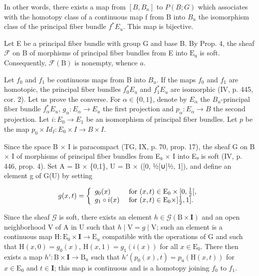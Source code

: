 In other words, there exists a map from \([B, B_{u}]\) to \(P(B; G)\) which associates with the homotopy class of a continuous map f from B into \(B_{u}\) the isomorphism class of the principal fiber bundle \(f^{*}E_{u}\). This map is bijective.

Let E be a principal fiber bundle with group G and base B. By Prop. 4, the sheaf \(\mathcal{F}\) on B of morphisms of principal fiber bundles from E into \(\mathrm{E_u}\) is soft. Consequently, \(\mathcal{F}(\mathrm{B})\) is nonempty, whence \(a\).

Let \(f_{0}\) and \(f_{1}\) be continuous maps from B into \(B_{u}\). If the maps \(f_{0}\) and \(f_{1}\) are homotopic, the principal fiber bundles \(f_{0}^{*}E_{u}\) and \(f_{1}^{*}E_{u}\) are isomorphic (IV, p. 445, cor. 2). Let us prove the converse. For \(\alpha\in\{0,1\}\), denote by \(E_{\alpha}\) the \(B_{u}\)-principal fiber bundle \(f_{\alpha}^{*}E_{u}\), \(g_{\alpha} \colon E_{\alpha} \to E_{u}\) the first projection and \(p_{\alpha} \colon E_{\alpha} \to B\) the second projection. Let \(i \colon E_{0} \to E_{1}\) be an isomorphism of principal fiber bundles. Let \(p\) be the map \(p_{0} \times Id_{I} \colon E_{0} \times I \to B \times I\).

Since the space B × I is paracompact (TG, IX, p. 70, prop. 17), the sheaf G on B × I of morphisms of principal fiber bundles from E₀ × I into Eᵤ is soft (IV, p. 446, prop. 4). Set A = B × \{0,1\}, U = B × ([0, ½[∪]½, 1]), and define an element g of G(U) by setting

\[
g (x, t) = \left\{ \begin{array}{l l} g _ {0} (x) & \text { for } (x, t) \in \mathrm{E} _ {0} \times [ 0, \frac {1}{2} [, \\ g _ {1} \circ i (x) & \text { for } (x, t) \in \mathrm{E} _ {0} \times ] \frac {1}{2}, 1 ]. \end{array} \right.
\]

Since the sheaf \(\mathcal{G}\) is soft, there exists an element \(h \in \mathcal{G}(\mathrm{B} \times \mathbf{I})\) and an open neighborhood V of A in U such that \(h \mid \mathrm{V} = g \mid \mathrm{V}\); such an element is a continuous map \(\mathrm{H} \colon \mathrm{E}_0 \times \mathbf{I} \to \mathrm{E}_{u}\) compatible with the operations of G and such that \(\mathrm{H}(x,0) = g_0(x)\), \(\mathrm{H}(x,1) = g_1(i(x))\) for all \(x \in \mathrm{E}_0\). There then exists a map \(h' \colon \mathrm{B} \times \mathbf{I} \to \mathrm{B}_{u}\) such that \(h'(p_0(x),t) = p_{\mathrm{u}}(\mathrm{H}(x,t))\) for \(x \in \mathrm{E}_0\) and \(t \in \mathbf{I}\); this map is continuous and is a homotopy joining \(f_0\) to \(f_1\).

